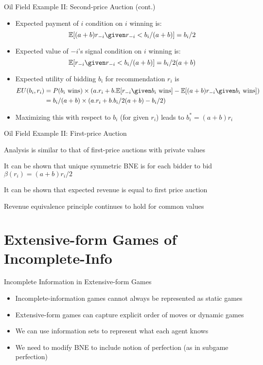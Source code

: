 \documentclass[11pt,aspectratio=169,handout]{beamer}
\begin{document}
  
  \begin{frame}{Oil Field Example II: Second-price Auction (cont.)}
   \begin{itemize}
    \item Expected payment of $i$ condition on $i$ winning is:
    $$\mathbb{E}[(a+b)r_{-i}  \given  r_{-i} < b_i/(a+b)] = b_i/2$$
    \item Expected value of $-i$'s signal condition on $i$ winning is:
    $$\mathbb{E}[r_{-i}  \given  r_{-i} < b_i/(a+b)] = b_i/2(a + b)$$
    \item Expected utility of bidding $b_i$ for recommendation $r_i$ is
    \begin{align*}
     EU(b_i, r_i) & = P(b_i \text{ wins}) \times \left(a.r_i + b.\mathbb{E}[r_{-i}  \given  b_i \text{ wins}] - \mathbb{E}[(a+b)r_{-i}  \given  b_i \text{ wins}]\right) \\
     & = b_i/(a + b) \times (a.r_i + b.b_i/2(a + b) - b_i/2) 
    \end{align*}
    \item Maximizing this with respect to $b_i$ (for given $r_i$) leads to $b_i^* = (a + b) r_i$
   \end{itemize}
  \end{frame}

  \begin{frame}{Oil Field Example II: First-price Auction}
   \begin{itemizes}
    \item Analysis is similar to that of first-price auctions with private values
    \item It can be shown that unique symmetric BNE is for each bidder to bid $\beta(r_i)=(a+b)r_i/2$ 
    \item It can be shown that expected revenue is equal to first price auction
    \item Revenue equivalence principle \alert{continues to hold} for common values  
   \end{itemizes}
  \end{frame}
  
  
 \section{Extensive-form Games of Incomplete-Info}
 
  \begin{frame}{Incomplete Information in Extensive-form Games}
   \begin{itemize}[<+->]
   \setlength{\itemsep}{1.3em}
    \item Incomplete-information games cannot always be represented as \alert{static games}
    \item Extensive-form games can capture explicit order of moves or \alert{dynamic games}
    \item We can use \alert{information sets} to represent what each agent knows
    \item We need to modify BNE to include notion of \alert{perfection} (as in subgame perfection)
   \end{itemize}
  \end{frame}
\end{document}
